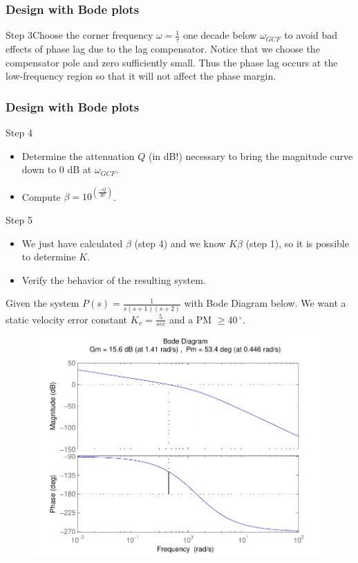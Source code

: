 \begin{frame}
\frametitle{Design with Bode plots}
\begin{block}{Step 3}Choose the corner frequency $\omega = \frac{1}{\tau}$ one decade below $\omega_{GCF}$ to avoid bad effects of phase lag due to the lag compensator. Notice that we choose the compensator pole and zero sufficiently small. Thus the phase lag occurs at the low-frequency region so that it will not affect the phase margin.
\end{block}
\end{frame}

\begin{frame}
\frametitle{Design with Bode plots}
\begin{block}{Step 4}
	\begin{itemize}
\item Determine the attenuation $Q$ (in dB!) necessary to bring the magnitude curve down to 0 dB at $\omega_{GCF}$. 
\item Compute $\beta = 10^{(\frac{-Q}{20})}$.
\end{itemize}

\end{block}
\begin{block}{Step 5}
	\begin{itemize}
\item 	We just have calculated $\beta$ (step 4) and we know $K\beta$ (step 1), so it is possible to determine $K$.
\item 	Verify the behavior of the resulting system.
\end{itemize}
\end{block}
\end{frame}


\begin{frame}
\begin{example}
Given the system $P(s) = \frac{1}{s(s+1)(s+2)}$ with Bode Diagram below.
We want a static velocity error constant $K_v =\frac{5}{sec}$ and a PM $ \geq 40\,^{\circ}$.
\begin{figure}
	\centering
	\includegraphics[width=0.5
	\linewidth]{examplelag}
\end{figure}
\end{example}
\end{frame}

